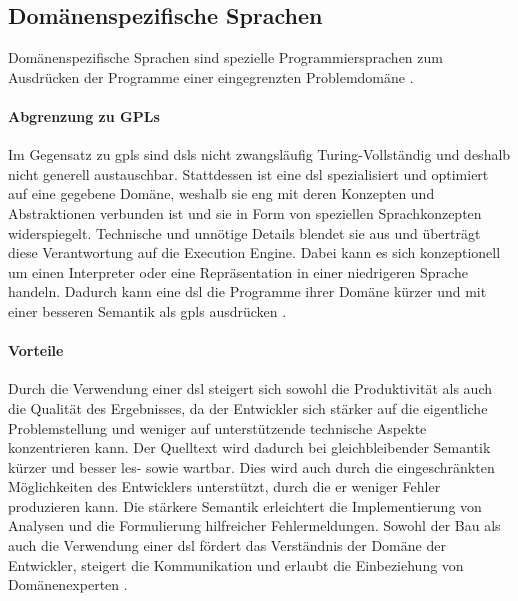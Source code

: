 \subsection{Domänenspezifische Sprachen}
    Domänenspezifische Sprachen
    sind spezielle Programmiersprachen zum Ausdrücken der Programme einer eingegrenzten
    Problemdomäne \cite[Kapitel 2.2]{voelter:DslEngineering}.

    \paragraph{Abgrenzung zu GPLs}
    Im Gegensatz zu \glspl{gpl} sind \glspl{dsl} nicht zwangsläufig Turing-Vollständig
    und deshalb nicht generell austauschbar.
    Stattdessen ist eine \gls{dsl} spezialisiert und optimiert auf eine gegebene Domäne,
    weshalb sie eng mit deren Konzepten und Abstraktionen verbunden ist
    und sie in Form von speziellen Sprachkonzepten widerspiegelt.
    Technische und unnötige Details blendet sie aus und überträgt diese Verantwortung
    auf die Execution Engine.
    Dabei kann es sich konzeptionell um einen Interpreter oder eine Repräsentation in einer
    niedrigeren Sprache handeln.
    Dadurch kann eine \gls{dsl} die Programme ihrer Domäne kürzer und mit einer besseren Semantik
    als \glspl{gpl} ausdrücken \cite[Kapitel 2.2]{voelter:DslEngineering}.

    \paragraph{Vorteile}
    Durch die Verwendung einer \gls{dsl} steigert sich sowohl die Produktivität
    als auch die Qualität des Ergebnisses,
    da der Entwickler sich stärker auf die eigentliche Problemstellung und weniger
    auf unterstützende technische Aspekte konzentrieren kann.
    Der Quelltext wird dadurch bei gleichbleibender Semantik kürzer und besser les- sowie wartbar.
    Dies wird auch durch die eingeschränkten Möglichkeiten des Entwicklers unterstützt,
    durch die er weniger Fehler produzieren kann.
    Die stärkere Semantik erleichtert die Implementierung von Analysen und die Formulierung
    hilfreicher Fehlermeldungen.
    Sowohl der Bau als auch die Verwendung einer \gls{dsl} fördert das Verständnis der Domäne
    der Entwickler, steigert die Kommunikation und erlaubt die Einbeziehung von Domänenexperten
    \cite[Kapitel 2.5]{voelter:DslEngineering}.

